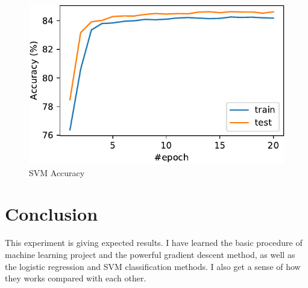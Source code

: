 \documentclass[journal, a4paper]{IEEEtran}
\begin{document}
\begin{figure}
    \includegraphics[width=\linewidth]{figures/svm/acc.pdf}
    \caption{SVM Accuracy}
    \label{figure:svm-acc}
\end{figure}

\section{Conclusion}

This experiment is giving expected results. I have learned the basic procedure of machine learning project and the powerful gradient descent method, as well as the logistic regression and SVM classification methods. I also get a sense of how they works compared with each other.
\end{document}

